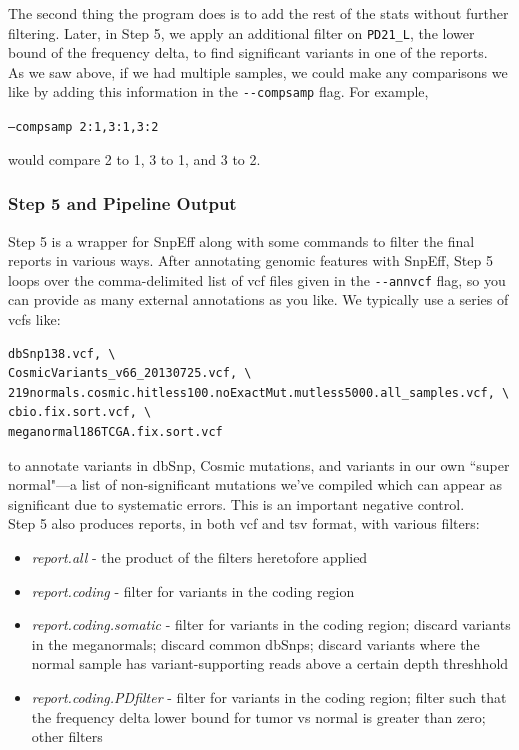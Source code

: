 \documentclass[letterpaper,14pt]{memoir}
\begin{document}
\noindent The second thing the program does is to add the rest of the stats without further filtering. Later, in Step 5, we apply an additional filter on \texttt{PD21\_L}, the lower bound of the frequency delta, to find significant variants in one of the reports.\\

\noindent As we saw above, if we had multiple samples, we could make any comparisons we like by adding this information in the \texttt{-{}-compsamp} flag. For example, 

\begin{center}
\texttt{--compsamp 2:1,3:1,3:2}
\end{center}

\noindent would compare 2 to 1, 3 to 1, and 3 to 2.

\subsubsection{Step 5 and Pipeline Output}

Step 5 is a wrapper for SnpEff along with some commands to filter the final reports in various ways.
After annotating genomic features with SnpEff, Step 5 loops over the comma-delimited list of vcf files given in the \texttt{-{}-annvcf} flag, so you can provide as many external annotations as you like.
We typically use a series of vcfs like: 

\begin{Verbatim}
dbSnp138.vcf, \
CosmicVariants_v66_20130725.vcf, \
219normals.cosmic.hitless100.noExactMut.mutless5000.all_samples.vcf, \
cbio.fix.sort.vcf, \
meganormal186TCGA.fix.sort.vcf
\end{Verbatim}

\noindent to annotate variants in dbSnp, Cosmic mutations, and variants in our own ``super normal"---a list of non-significant mutations we've compiled which can appear as significant due to systematic errors. This is an important negative control.\\

\noindent Step 5 also produces reports, in both vcf and tsv format, with various filters:

\begin{itemize}
\tightlist
\item
  \textit{report.all} - the product of the filters heretofore applied
\item
  \textit{report.coding} - filter for variants in the coding region
\item
  \textit{report.coding.somatic} - filter for variants in the coding region;
   discard variants in the meganormals;
   discard common dbSnps;
   discard variants where the normal sample has variant-supporting reads above a certain depth threshhold
\item
  \textit{report.coding.PDfilter} - filter for variants in the coding region;
   filter such that the frequency delta lower bound for tumor vs normal is greater than zero;
   other filters
\end{itemize}
\end{document}
